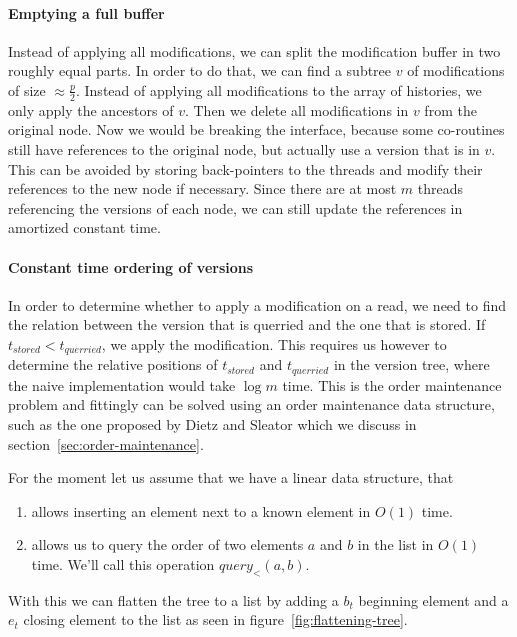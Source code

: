 \documentclass[11pt,a4paper,twoside,openright]{Thesis}
\theoremstyle{definition}
\newcommand{\Figref}[1]{figure~\ref{fig:#1}}
\newcommand{\Secref}[1]{section~\ref{sec:#1}}
\begin{document}
\paragraph{Emptying a full buffer} Instead of applying all modifications, we 
can split the modification buffer in two roughly equal parts. In order to do 
that, we can find a subtree $v$ of modifications of size $\approx \frac{p}{2}$. 
Instead of applying all modifications to the array of histories, we only 
apply the ancestors of $v$. Then we delete all modifications in $v$ from the 
original node. Now we would be breaking the interface, because some 
co-routines still have references to the original node, but actually use a 
version that is in $v$. This can be avoided by storing back-pointers to the 
threads and modify their references to the new node if necessary. Since there
are at most $m$ threads referencing the versions of each node, we can still
update the references in amortized constant time.

\paragraph{Constant time ordering of versions}
In order to determine whether to apply a modification on a read, we need to 
find the relation between the version that is querried and the one that is 
stored. If $t_{stored} < t_{querried}$, we apply the modification. This 
requires us however to determine the relative positions of $t_{stored}$ and 
$t_{querried}$ in the version tree, where the naive implementation would take 
$\log m$ time. This is the order maintenance problem and fittingly can be 
solved using an order maintenance data structure, such as the one proposed by 
Dietz and Sleator\cite{Diet87b} which we discuss in \Secref{order-maintenance}.

For the moment let us assume that we have a linear data structure, that
\begin{enumerate}
  \item allows inserting an element next to a known element in $O(1)$ time.
  \item allows us to query the order of two elements $a$ and $b$ in the list 
    in $O(1)$ time. We'll call this operation $query_<(a, b)$.
\end{enumerate}

With this we can flatten the tree to a list by adding a $b_t$ beginning 
element and a $e_t$ closing element to the list as seen in
\Figref{flattening-tree}.
\end{document}
